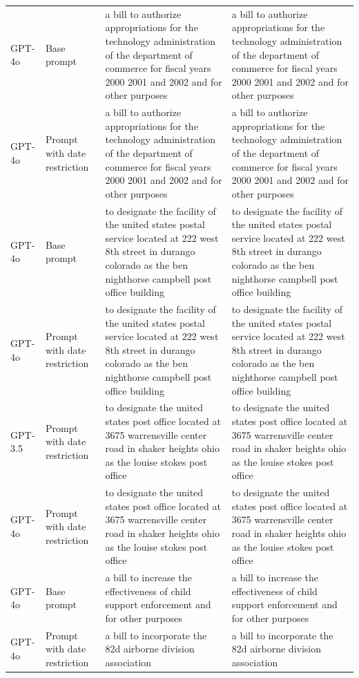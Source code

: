 \begin{longtable}{>{\raggedright\arraybackslash}p{1.4cm}>{\raggedright\arraybackslash}p{1.4cm}>{\raggedright\arraybackslash}p{5.5cm}>{\raggedright\arraybackslash}p{5.5cm}}
GPT-4o & Base prompt & a bill to authorize appropriations for the technology administration of the department of commerce for fiscal years 2000 2001 and 2002 and for other purposes & a bill to authorize appropriations for the technology administration of the department of commerce for fiscal years 2000 2001 and 2002 and for other purposes\\
GPT-4o & Prompt with date restriction & a bill to authorize appropriations for the technology administration of the department of commerce for fiscal years 2000 2001 and 2002 and for other purposes & a bill to authorize appropriations for the technology administration of the department of commerce for fiscal years 2000 2001 and 2002 and for other purposes\\
GPT-4o & Base prompt & to designate the facility of the united states postal service located at 222 west 8th street in durango colorado as the ben nighthorse campbell post office building & to designate the facility of the united states postal service located at 222 west 8th street in durango colorado as the ben nighthorse campbell post office building\\
GPT-4o & Prompt with date restriction & to designate the facility of the united states postal service located at 222 west 8th street in durango colorado as the ben nighthorse campbell post office building & to designate the facility of the united states postal service located at 222 west 8th street in durango colorado as the ben nighthorse campbell post office building\\
GPT-3.5 & Prompt with date restriction & to designate the united states post office located at 3675 warrensville center road in shaker heights ohio as the louise stokes post office & to designate the united states post office located at 3675 warrensville center road in shaker heights ohio as the louise stokes post office\\
GPT-4o & Prompt with date restriction & to designate the united states post office located at 3675 warrensville center road in shaker heights ohio as the louise stokes post office & to designate the united states post office located at 3675 warrensville center road in shaker heights ohio as the louise stokes post office\\
GPT-4o & Base prompt & a bill to increase the effectiveness of child support enforcement and for other purposes & a bill to increase the effectiveness of child support enforcement and for other purposes\\
GPT-4o & Prompt with date restriction & a bill to incorporate the 82d airborne division association & a bill to incorporate the 82d airborne division association\\

\end{longtable}

